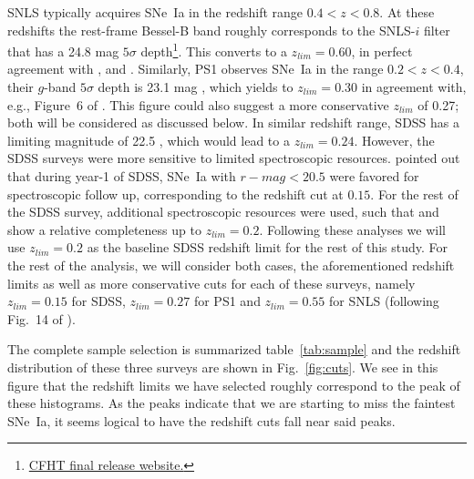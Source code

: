 \documentclass[]{aa} %
\newcommand{\nn}[1]{{\textcolor[rgb]{1, 0.27, 0}{#1}}}
\begin{document}
SNLS typically acquires SNe~Ia in the redshift range $0.4<z<0.8$. At these
redshifts the rest-frame Bessel-B band roughly corresponds to the SNLS-$i$
filter that has a 24.8 mag $5\sigma$
depth\footnote{\href{https://www.cfht.hawaii.edu/Science/CFHTLS/cfhtlsfinalreleaseexecsummary.html}{CFHT
final release website.}}. This converts to a $z_{lim}=0.60$, in perfect
agreement with \cite{neill2006}, \cite{perrett2010} and \cite{bazin2011}.
Similarly, PS1 observes SNe~Ia in the range $0.2<z<0.4$, their $g$-band
$5\sigma$ depth is 23.1 mag \citep{rest2014}, which yields to $z_{lim}=0.30$ in
agreement with, e.g., Figure~6 of \cite{scolnic2018a}. This figure could also
suggest a more conservative $z_{lim}$ of 0.27; both will be considered as
discussed below.  In similar redshift range, SDSS has a limiting magnitude of
22.5 \citep{dilday2008,sako2008}, which would lead to a $z_{lim}=0.24$. However,
the SDSS surveys were more sensitive to limited spectroscopic resources.
\cite{kessler2009} \nn{pointed out} that during year-1 of SDSS, SNe~Ia with
$r-mag<20.5$ were favored for spectroscopic follow up, corresponding to the
redshift cut at $0.15$. For the rest of the SDSS survey, additional
spectroscopic resources were used, such that \cite{kessler2009} and
\cite{dilday2008} show a relative completeness up to $z_{lim}=0.2$. Following
these analyses we will use $z_{lim}=0.2$ as the baseline SDSS redshift limit for
the rest of \nn{this study}. For the rest of the analysis, we will consider both
cases, the \nn{aforementioned} redshift limits as well as more conservative cuts
for each of these surveys, namely $z_{lim}=0.15$ for SDSS, $z_{lim}=0.27$ for
PS1 and $z_{lim}=0.55$ for SNLS (following Fig.~14 of \citealt{perrett2010}).

The complete sample selection is summarized table~\ref{tab:sample} and the
redshift distribution of these three surveys are shown in Fig.~\ref{fig:cuts}.
We see in this figure that the redshift limits we have selected roughly
correspond to the peak of these histograms\nn{. As the peaks indicate that we
are starting to miss the faintest SNe~Ia, it seems logical to have the redshift
cuts fall near said peaks.}
\end{document}
